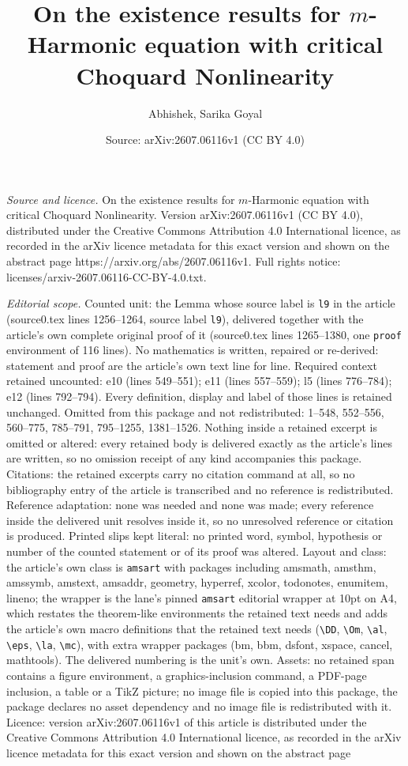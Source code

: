 \documentclass[10pt,a4paper]{amsart}
\title[On the existence results for $m$-Harmonic equation with crit]{On the existence results for $m$-Harmonic equation with critical Choquard Nonlinearity}
\author{Abhishek, Sarika Goyal}
\date{Source: arXiv:2607.06116v1 (CC BY 4.0)}
\begin{document}
\maketitle

\noindent\emph{Source and licence.} On the existence results for $m$-Harmonic equation with critical Choquard Nonlinearity. Version arXiv:2607.06116v1 (CC BY 4.0), distributed under the Creative Commons Attribution 4.0 International licence, as recorded in the arXiv licence metadata for this exact version and shown on the abstract page https://arxiv.org/abs/2607.06116v1. Full rights notice: licenses/arxiv-2607.06116-CC-BY-4.0.txt.\par\smallskip

\noindent\textit{Editorial scope.} Counted unit: the Lemma whose source label is \texttt{l9} in the article (source0.tex lines 1256--1264, source label \texttt{l9}), delivered together with the article's own complete original proof of it (source0.tex lines 1265--1380, one \texttt{proof} environment of 116 lines). No mathematics is written, repaired or re-derived: statement and proof are the article's own text line for line. Required context retained uncounted: e10 (lines 549--551); e11 (lines 557--559); l5 (lines 776--784); e12 (lines 792--794). Every definition, display and label of those lines is retained unchanged. Omitted from this package and not redistributed: 1--548, 552--556, 560--775, 785--791, 795--1255, 1381--1526. Nothing inside a retained excerpt is omitted or altered: every retained body is delivered exactly as the article's lines are written, so no omission receipt of any kind accompanies this package. Citations: the retained excerpts carry no citation command at all, so no bibliography entry of the article is transcribed and no reference is redistributed. Reference adaptation: none was needed and none was made; every reference inside the delivered unit resolves inside it, so no unresolved reference or citation is produced. Printed slips kept literal: no printed word, symbol, hypothesis or number of the counted statement or of its proof was altered. Layout and class: the article's own class is \texttt{amsart} with packages including amsmath, amsthm, amssymb, amstext, amsaddr, geometry, hyperref, xcolor, todonotes, enumitem, lineno; the wrapper is the lane's pinned \texttt{amsart} editorial wrapper at 10pt on A4, which restates the theorem-like environments the retained text needs and adds the article's own macro definitions that the retained text needs (\texttt{\textbackslash DD}, \texttt{\textbackslash Om}, \texttt{\textbackslash al}, \texttt{\textbackslash eps}, \texttt{\textbackslash la}, \texttt{\textbackslash mc}), with extra wrapper packages (bm, bbm, dsfont, xspace, cancel, mathtools). The delivered numbering is the unit's own. Assets: no retained span contains a figure environment, a graphics-inclusion command, a PDF-page inclusion, a table or a TikZ picture; no image file is copied into this package, the package declares no asset dependency and no image file is redistributed with it. Licence: version arXiv:2607.06116v1 of this article is distributed under the Creative Commons Attribution 4.0 International licence, as recorded in the arXiv licence metadata for this exact version and shown on the abstract page 
\end{document}
